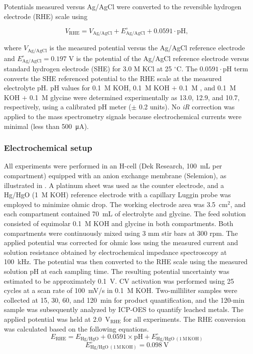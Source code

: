 \documentclass[twoside,twocolumn,9pt]{article}
\begin{document}
Potentials measured versus Ag/AgCl were converted to the reversible hydrogen electrode (RHE) scale using

\begin{equation}
V_{\mathrm{RHE}} = V_{\mathrm{Ag/AgCl}} + E_{\mathrm{Ag/AgCl}}^{\circ} + 0.0591 \cdot \mathrm{pH},
\end{equation}

where \(V_{\mathrm{Ag/AgCl}}\) is the measured potential versus the Ag/AgCl reference electrode and \(E_{\mathrm{Ag/AgCl}}^{\circ} = 0.197\) V is the potential of the Ag/AgCl reference electrode versus standard hydrogen electrode (SHE) for 3.0 M KCl at 25 \(^\circ\)C. The \(0.0591 \cdot \mathrm{pH}\) term converts the SHE referenced potential to the RHE scale at the measured electrolyte pH. pH values for \SI{0.1}{M} KOH, \SI{0.1}{M} KOH $+$ \SI{0.1}{M} , and \SI{0.1}{M} KOH $+$ \SI{0.1}{M} glycine were determined experimentally as 13.0, 12.9, and 10.7, respectively, using a calibrated pH meter ($\pm$ 0.2 units). No \textit{iR} correction was applied to the mass spectrometry signals because electrochemical currents were minimal (less than \SI{500}{\micro\ampere}).



\subsubsection{Electrochemical setup}

All experiments were performed in an H-cell (Dek Research, 100~mL per compartment) equipped with an anion exchange membrane (Selemion), as illustrated in . A platinum sheet was used as the counter electrode, and a Hg/HgO (1~M KOH) reference electrode with a capillary Luggin probe was employed to minimize ohmic drop. The working electrode area was 3.5~cm$^2$, and each compartment contained 70~mL of electrolyte and glycine. The feed solution consisted of equimolar 0.1~M KOH and glycine in both compartments. Both compartments were continuously mixed using 3 mm stir bars at 300 rpm. The applied potential was corrected for ohmic loss using the measured current and solution resistance obtained by electrochemical impedance spectroscopy at 100~kHz. The potential was then converted to the RHE scale using the measured solution pH at each sampling time. The resulting potential uncertainty was estimated to be approximately 0.1~V. CV activation was performed using 25 cycles at a scan rate of 100~mV/s in 0.1~M KOH. Two-milliliter samples were collected at 15, 30, 60, and 120~min for product quantification, and the 120-min sample was subsequently analyzed by ICP-OES to quantify leached metals. The applied potential was held at 2.0~V$_{\mathrm{RHE}}$ for all experiments. The RHE conversion was calculated based on the following equations. \[
E_{\mathrm{RHE}} = E_{\mathrm{Hg/HgO}} + 0.0591 \times \mathrm{pH} + E^\circ_{\mathrm{Hg/HgO}\,(1\,\mathrm{M\,KOH})}
\]
\[
E^\circ_{\mathrm{Hg/HgO}\,(1\,\mathrm{M\,KOH})} = 0.098~\mathrm{V}
\]
\end{document}
